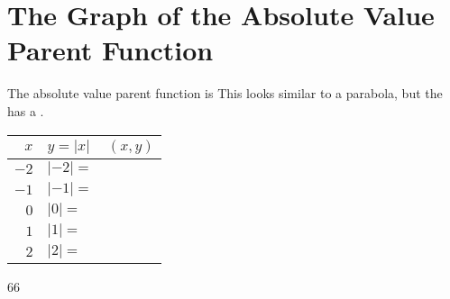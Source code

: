 \section{The Graph of the Absolute Value Parent Function}

The absolute value parent function is 
\myCenteredBox[width=1.75in,valign=center]{
    \large
    \vspace{-1.2em}
    \[ f(x) = |x| \]
}
%
This looks similar to a parabola, but the  has a  .

\begin{minipage}{0.5\textwidth}
    \centering 
    \renewcommand{\arraystretch}{1.75}
    \begin{tabular}{r|p{1.25in}|c}
        $x$ 
            & $y = |x|$    
            & $(x,y)$\\ \hline\hline
        $-2$ 
            & $|-2| = $  
            & \phantom{$(-9,9)$}\\ \hline
        $-1$ 
            & $|-1| = $  
            & \\ \hline
        $0$ 
            & $|0| = $    
            & \\ \hline
        $1$ 
            & $|1| = $    
            & \\ \hline
        $2$ 
            & $|2| = $    
            & \\ \hline
    \end{tabular}
\end{minipage}
\begin{minipage}{0.5\textwidth}
    \centering
    \begin{myTikzpictureGrid}{0.4} {6}{6}
    \end{myTikzpictureGrid}
\end{minipage}